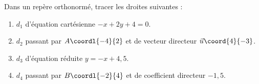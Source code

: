 \begin{exo}{}
	Dans un repère orthonormé, tracer les droites suivantes :
	\begin{enumerate}
		\item $d_1$ d'équation cartésienne $-x + 2y + 4 = 0$.
		\item $d_2$ passant par $A\coordl{-4}{2}$ et de vecteur directeur $\vec{u}\coord{4}{-3}$.
		\item $d_3$ d'équation réduite $y = -x + 4,5$.
		\item $d_4$ passant par $B\coordl{-2}{4}$ et de coefficient directeur $-1,5$.
	\end{enumerate}
\end{exo}
